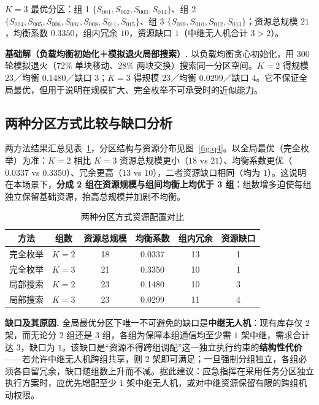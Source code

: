 $K=3$ 最优分区：组 1 $\{S_{001},S_{002},S_{003},S_{014}\}$、组 2 $\{S_{004},S_{005},S_{006},S_{007},S_{008},S_{011},S_{015}\}$、组 3 $\{S_{009},S_{010},S_{012},S_{013}\}$；资源总规模 $21$，均衡系数 $0.3350$，组内冗余 $10$，资源缺口 $1$（中继无人机合计 $3>2$）。

\textbf{基础解（负载均衡初始化＋模拟退火局部搜索）.} 以负载均衡贪心初始化，用 $300$ 轮模拟退火（$72\%$ 单块移动、$28\%$ 两块交换）搜索同一分区空间。$K=2$ 得规模 $23$／均衡 $0.1480$／缺口 $3$；$K=3$ 得规模 $23$／均衡 $0.0299$／缺口 $4$。它不保证全局最优，但用于说明在规模扩大、完全枚举不可承受时的近似能力。

\subsection{两种分区方式比较与缺口分析}

两方法结果汇总见表~\ref{tab:q4}，分区结构与资源分布见图~\ref{fig:q4}。以全局最优（完全枚举）为准：$K=2$ 相比 $K=3$ 资源总规模更小（$18$ vs $21$）、均衡系数更优（$0.0337$ vs $0.3350$）、冗余更高（$13$ vs $10$），二者资源缺口相同（均为 $1$）。这说明在本场景下，\textbf{分成 2 组在资源规模与组间均衡上均优于 3 组}：组数增多迫使每组独立保留基础资源，抬高总规模并加剧不均衡。

\begin{table}[htbp]
\centering
\caption{两种分区方式资源配置对比}
\label{tab:q4}
\renewcommand{\arraystretch}{1.2}
\begin{tabular}{c|c|c|c|c|c}
\toprule
方法 & 组数 & 资源总规模 & 均衡系数 & 组内冗余 & 资源缺口 \\
\midrule
完全枚举 & $K{=}2$ & 18 & 0.0337 & 13 & 1 \\
完全枚举 & $K{=}3$ & 21 & 0.3350 & 10 & 1 \\
局部搜索 & $K{=}2$ & 23 & 0.1480 & 10 & 3 \\
局部搜索 & $K{=}3$ & 23 & 0.0299 & 11 & 4 \\
\bottomrule
\end{tabular}
\end{table}

\textbf{缺口及其原因.} 全局最优分区下唯一不可避免的缺口是\textbf{中继无人机}：现有库存仅 $2$ 架，而无论分 $2$ 组还是 $3$ 组，各组为保障本组通信均至少需 $1$ 架中继，需求合计达 $3$，缺口为 $1$。该缺口是“资源不得跨组调配”这一独立执行约束的\textbf{结构性代价}——若允许中继无人机跨组共享，则 $2$ 架即可满足；一旦强制分组独立，各组必须各自留冗余，缺口随组数上升而不减。据此建议：应急指挥在采用任务分区独立执行方案时，应优先增配至少 $1$ 架中继无人机，或对中继资源保留有限的跨组机动权限。

